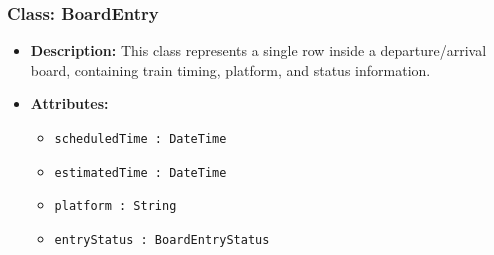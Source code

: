 \documentclass{article}
\begin{document}
\subsubsection*{Class: BoardEntry}
\begin{itemize}
    \item \textbf{Description:} This class represents a single row inside a departure/arrival board, containing train timing, platform, and status information.
    \item \textbf{Attributes:}
    \begin{itemize}
    \item \texttt{scheduledTime : DateTime}
    \item \texttt{estimatedTime : DateTime}
    \item \texttt{platform : String}
    \item \texttt{entryStatus : BoardEntryStatus}
    \end{itemize}
\end{itemize}

\end{document}

